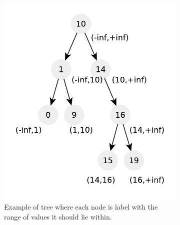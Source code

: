 \begin{figure}
	\vspace*{-0.5in}
	\centering
	\begin{subfigure}[t]{0.52\textwidth}
		\includegraphics[width=1\linewidth]{sources/verify_BST/images/example4_ranges}
		\caption{Example of tree where each node is label with the range of values it should lie within.}
		\label{ex:verify_BST:example4_ranges}
	 \end{subfigure}
	\hfill
	\begin{subfigure}[t]{0.35\textwidth}

\end{subfigure}
\end{figure}
